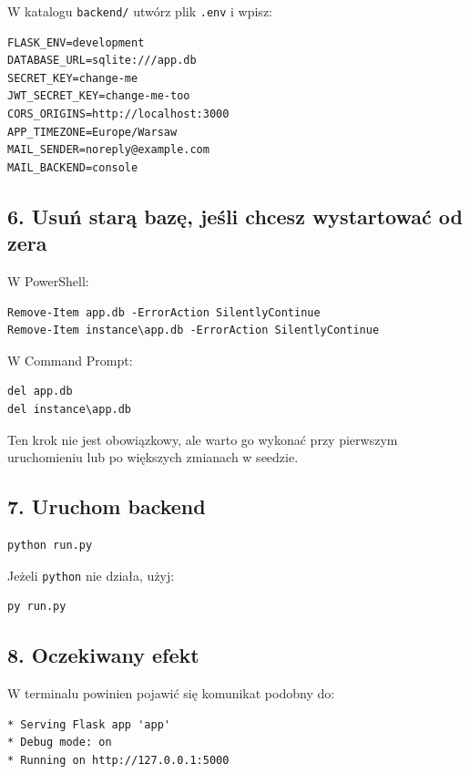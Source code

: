 \documentclass[11pt,a4paper]{article}
\begin{document}
W katalogu \texttt{backend/} utwórz plik \texttt{.env} i wpisz:

\begin{lstlisting}
FLASK_ENV=development
DATABASE_URL=sqlite:///app.db
SECRET_KEY=change-me
JWT_SECRET_KEY=change-me-too
CORS_ORIGINS=http://localhost:3000
APP_TIMEZONE=Europe/Warsaw
MAIL_SENDER=noreply@example.com
MAIL_BACKEND=console
\end{lstlisting}

\subsection{6. Usuń starą bazę, jeśli chcesz wystartować od zera}

W PowerShell:

\begin{lstlisting}
Remove-Item app.db -ErrorAction SilentlyContinue
Remove-Item instance\app.db -ErrorAction SilentlyContinue
\end{lstlisting}

W Command Prompt:

\begin{lstlisting}
del app.db
del instance\app.db
\end{lstlisting}

Ten krok nie jest obowiązkowy, ale warto go wykonać przy pierwszym uruchomieniu lub po większych zmianach w seedzie.

\subsection{7. Uruchom backend}

\begin{lstlisting}
python run.py
\end{lstlisting}

Jeżeli \texttt{python} nie działa, użyj:

\begin{lstlisting}
py run.py
\end{lstlisting}

\subsection{8. Oczekiwany efekt}

W terminalu powinien pojawić się komunikat podobny do:

\begin{lstlisting}
* Serving Flask app 'app'
* Debug mode: on
* Running on http://127.0.0.1:5000
\end{lstlisting}
\end{document}
